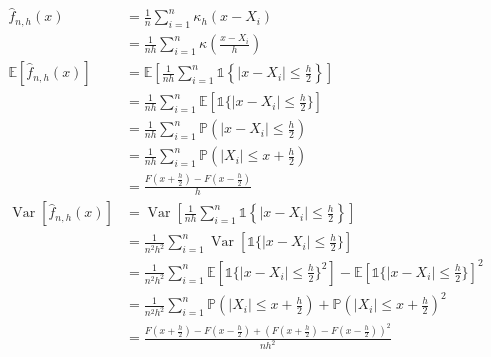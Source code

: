 \documentclass[11pt]{report}
\DeclareMathOperator{\Var}{\text{Var}}
\newcommand{\ind}{{\mathds{1}}}
\newcommand{\E}{\mathbb{E}}
\renewcommand{\P}{\mathbb{P}}
\newcommand{\abs}[1]{\left\lvert#1\right\rvert}
\begin{document}
\begin{enumerate}[1.]
\begin{enumerate}
                    \color{blue}
                    \begin{align*}
                        \hat f_{n, h}(x)       & = \frac{1}{n} \sum_{i=1}^n \kappa_h(x - X_i)                                                                                                        \\
                                               & = \frac{1}{nh} \sum_{i=1}^n \kappa(\frac{x - X_i}{h})                                                                                               \\
                        \E[\hat f_{n, h}(x)]   & = \E\left[\frac{1}{nh} \sum_{i=1}^n \ind\left\{\abs{x - X_i} \leq \frac{h}{2}\right\}\right]                                                        \\
                                               & = \frac{1}{nh} \sum_{i=1}^{n} \E\left[\ind\{\abs{x - X_i} \leq \frac{h}{2}\} \right]                                                                \\
                                               & = \frac{1}{nh} \sum_{i=1}^{n} \P(\abs{x - X_i} \leq \frac{h}{2})                                                                                    \\
                                               & = \frac{1}{nh} \sum_{i=1}^{n} \P(\abs{X_i} \leq x + \frac{h}{2})                                                                                    \\
                                               & = \frac{F(x + \frac{h}{2})  - F(x - \frac{h}{2})}{h}                                                                                                \\
                        \Var[\hat f_{n, h}(x)] & = \Var\left[\frac{1}{nh} \sum_{i=1}^n \ind\left\{\abs{x - X_i} \leq \frac{h}{2}\right\}\right]                                                      \\
                                               & = \frac{1}{n^2h^2} \sum_{i=1}^{n} \Var\left[\ind\{\abs{x - X_i} \leq \frac{h}{2}\} \right]                                                          \\
                                               & = \frac{1}{n^2h^2} \sum_{i=1}^{n} \E\left[\ind\{\abs{x - X_i} \leq \frac{h}{2}\}^2\right] - \E\left[\ind\{\abs{x - X_i} \leq \frac{h}{2}\}\right]^2 \\
                                               & = \frac{1}{n^2h^2} \sum_{i=1}^{n} \P(\abs{X_i} \leq x + \frac{h}{2}) + \P(\abs{X_i} \leq x + \frac{h}{2})^2                                         \\
                                               & = \frac{F(x + \frac{h}{2}) - F(x - \frac{h}{2}) + (F(x + \frac{h}{2}) - F(x - \frac{h}{2}))^2}{nh^2}
                    \end{align*}
                    \color{black}


\end{enumerate}
\end{enumerate}
\end{document}
